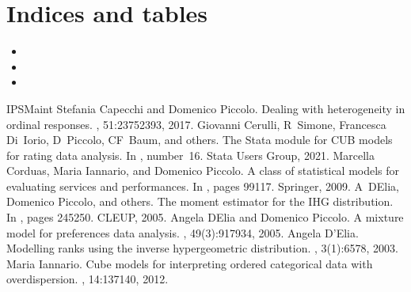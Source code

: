\documentclass[letterpaper,10pt,english]{sphinxmanual}
\begin{document}
\chapter{Indices and tables}
\label{\detokenize{index:indices-and-tables}}\begin{itemize}
\item {} 
\sphinxAtStartPar
{}

\item {} 
\sphinxAtStartPar
{}

\item {} 
\sphinxAtStartPar
{}

\end{itemize}

\begin{sphinxthebibliography}{IPSMaint}
\sphinxAtStartPar
Stefania Capecchi and Domenico Piccolo. Dealing with heterogeneity in ordinal responses. , 51:2375\textendash{}2393, 2017.
\sphinxAtStartPar
Giovanni Cerulli, R Simone, Francesca Di Iorio, D Piccolo, CF Baum, and others. The Stata module for CUB models for rating data analysis. In , number 16. Stata Users Group, 2021.
\sphinxAtStartPar
Marcella Corduas, Maria Iannario, and Domenico Piccolo. A class of statistical models for evaluating services and performances. In , pages 99\textendash{}117. Springer, 2009.
\sphinxAtStartPar
A D\textquotesingle{}Elia, Domenico Piccolo, and others. The moment estimator for the IHG distribution. In , pages 245\textendash{}250. CLEUP, 2005.
\sphinxAtStartPar
Angela D\textquotesingle{}Elia and Domenico Piccolo. A mixture model for preferences data analysis. , 49(3):917\textendash{}934, 2005.
\sphinxAtStartPar
Angela D’Elia. Modelling ranks using the inverse hypergeometric distribution. , 3(1):65\textendash{}78, 2003.
\sphinxAtStartPar
Maria Iannario. Cube models for interpreting ordered categorical data with overdispersion. , 14:137\textendash{}140, 2012.

\end{sphinxthebibliography}
\end{document}
